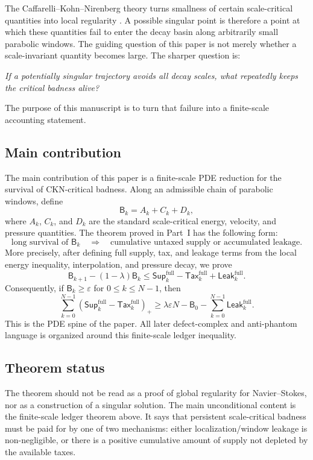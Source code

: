 \documentclass[11pt]{article}
\numberwithin{equation}{section}
\newcommand{\eps}{\varepsilon}
\newcommand{\Supp}{\mathsf{Sup}}
\newcommand{\Tax}{\mathsf{Tax}}
\newcommand{\Leak}{\mathsf{Leak}}
\newcommand{\Bbad}{\mathsf B}
\newcommand{\pos}[1]{\left(#1\right)_+}
\begin{document}
The Caffarelli--Kohn--Nirenberg theory turns smallness of certain
scale-critical quantities into local regularity \cite{Scheffer1976,Scheffer1977,CKN1982,Lin1998,Vasseur2007,SereginLectureNotes}.  A possible singular point
is therefore a point at which these quantities fail to enter the decay basin
along arbitrarily small parabolic windows.  The guiding question of this
paper is not merely whether a scale-invariant quantity becomes large.  The
sharper question is:
\begin{center}
\emph{If a potentially singular trajectory avoids all decay scales, what repeatedly keeps the critical badness alive?}
\end{center}
The purpose of this manuscript is to turn that failure into a finite-scale
accounting statement.

\subsection{Main contribution}

The main contribution of this paper is a finite-scale PDE reduction for the
survival of CKN-critical badness.  Along an admissible chain of parabolic
windows, define
\[
    \Bbad_k=A_k+C_k+D_k,
\]
where \(A_k\), \(C_k\), and \(D_k\) are the standard scale-critical energy,
velocity, and pressure quantities.  The theorem proved in Part~I has the
following form:
\[
\boxed{
\text{long survival of }\Bbad_k
\quad\Longrightarrow\quad
\text{cumulative untaxed supply or accumulated leakage.}
}
\]
More precisely, after defining full supply, tax, and leakage terms from the
local energy inequality, interpolation, and pressure decay, we prove
\[
\Bbad_{k+1}-(1-\lambda)\Bbad_k
\le
\Supp^{\mathrm{full}}_k-\Tax^{\mathrm{full}}_k+\Leak^{\mathrm{full}}_k.
\]
Consequently, if \(\Bbad_k\ge \eps\) for \(0\le k\le N-1\), then
\[
\sum_{k=0}^{N-1}
\pos{\Supp^{\mathrm{full}}_k-\Tax^{\mathrm{full}}_k}
\ge
\lambda\eps N-\Bbad_0-
\sum_{k=0}^{N-1}\Leak^{\mathrm{full}}_k.
\]
This is the PDE spine of the paper.  All later defect-complex and
anti-phantom language is organized around this finite-scale ledger
inequality.

\subsection{Theorem status}

The theorem should not be read as a proof of global regularity for
Navier--Stokes, nor as a construction of a singular solution.  The main
unconditional content is the finite-scale ledger theorem above.  It says
that persistent scale-critical badness must be paid for by one of two
mechanisms: either localization/window leakage is non-negligible, or there
is a positive cumulative amount of supply not depleted by the available
taxes.
\end{document}
